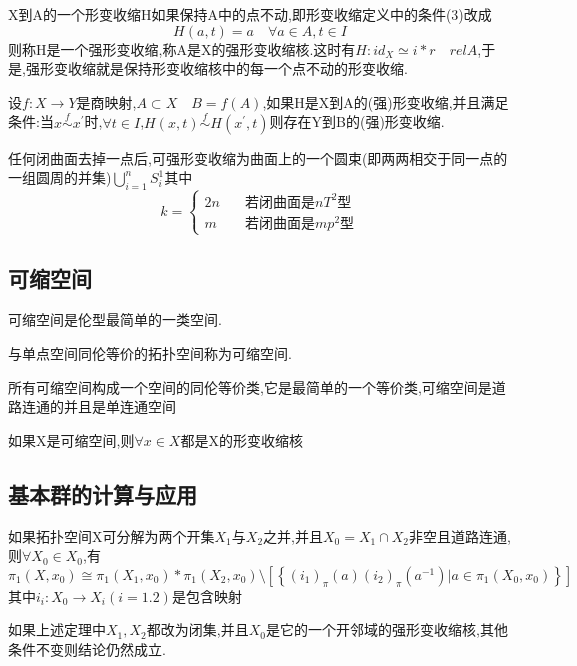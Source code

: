     \begin{definition}
        X到A的一个形变收缩H如果保持A中的点不动,即形变收缩定义中的条件(3)改成\[H(a,t) =a \quad \forall a \in A , t \in I \]
        则称H是一个强形变收缩,称A是X的强形变收缩核.这时有\(H : id_X \simeq i *r \quad relA \),于是,强形变收缩就是保持形变收缩核中的每一个点不动的形变收缩.
    \end{definition}
    \begin{corollary}
        设\(f: X \rightarrow Y\)是商映射,\(A \subset X \quad B=f(A)\),如果H是X到A的(强)形变收缩,并且满足条件:当\(x \overset{f}{\sim} x^{'}\)时,\(\forall t \in I \),\(H(x,t) \overset{f}{\sim}H(x^{'}, t)\)则存在Y到B的(强)形变收缩.
    \end{corollary}
    \begin{theorem}
        任何闭曲面去掉一点后,可强形变收缩为曲面上的一个圆束(即两两相交于同一点的一组圆周的并集)\(\bigcup_{i=1}^n S^1_i\)其中\[k=\begin{cases}
            2n \quad &\text{若闭曲面是} nT^2 \text{型} \\
            m  \quad &\text{若闭曲面是} mp^2 \text{型}
        \end{cases}\]
    \end{theorem}
\subsection*{可缩空间}
可缩空间是伦型最简单的一类空间.
\begin{definition}
    与单点空间同伦等价的拓扑空间称为可缩空间.
\end{definition}
所有可缩空间构成一个空间的同伦等价类,它是最简单的一个等价类,可缩空间是道路连通的并且是单连通空间
\begin{corollary}
    如果X是可缩空间,则\(\forall x \in X \)都是X的形变收缩核
\end{corollary}
\subsection*{基本群的计算与应用}
\begin{theorem}
如果拓扑空间X可分解为两个开集\(X_1\)与\(X_2\)之并,并且\(X_0 = X_1 \cap X_2\)非空且道路连通,则\(\forall X_0 \in X_0\),有
\[\pi_1 (X, x_0) \cong \pi_1(X_1 ,x_0) * \pi_1 (X_2 ,x_0) \setminus [\left\{(i_1)_{\pi}(a) (i_2)_{\pi}(a^{-1}) | a \in \pi_1 (X_0,x_0) \right\}]\]
其中\(i_i : X_0 \rightarrow X_i (i=1.2)\)是包含映射
\end{theorem}
\begin{theorem}
    如果上述定理中\(X_1 ,X_2\)都改为闭集,并且\(X_0\)是它的一个开邻域的强形变收缩核,其他条件不变则结论仍然成立.
\end{theorem}